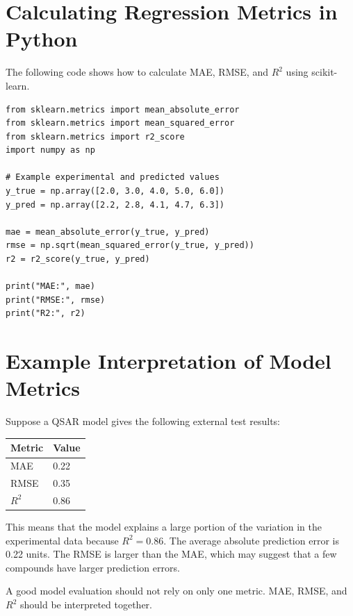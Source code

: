 \documentclass[11pt]{report}
\newenvironment{Important note}{\begin{quote}\color{red}\textbf{Important note:} }{\end{quote}}
\begin{document}
\section{Calculating Regression Metrics in Python}

The following code shows how to calculate MAE, RMSE, and $R^2$ using scikit-learn.

\begin{lstlisting}[style=pythonstyle, caption={Calculating MAE, RMSE, and R2 in Python.}]
from sklearn.metrics import mean_absolute_error
from sklearn.metrics import mean_squared_error
from sklearn.metrics import r2_score
import numpy as np

# Example experimental and predicted values
y_true = np.array([2.0, 3.0, 4.0, 5.0, 6.0])
y_pred = np.array([2.2, 2.8, 4.1, 4.7, 6.3])

mae = mean_absolute_error(y_true, y_pred)
rmse = np.sqrt(mean_squared_error(y_true, y_pred))
r2 = r2_score(y_true, y_pred)

print("MAE:", mae)
print("RMSE:", rmse)
print("R2:", r2)
\end{lstlisting}

\section{Example Interpretation of Model Metrics}

Suppose a QSAR model gives the following external test results:

\begin{center}
\begin{tabular}{ll}
\toprule
\textbf{Metric} & \textbf{Value} \\
\midrule
MAE & 0.22 \\
RMSE & 0.35 \\
$R^2$ & 0.86 \\
\bottomrule
\end{tabular}
\end{center}

This means that the model explains a large portion of the variation in the experimental data because $R^2 = 0.86$. The average absolute prediction error is 0.22 units. The RMSE is larger than the MAE, which may suggest that a few compounds have larger prediction errors.

A good model evaluation should not rely on only one metric. MAE, RMSE, and $R^2$ should be interpreted together.
\end{document}
